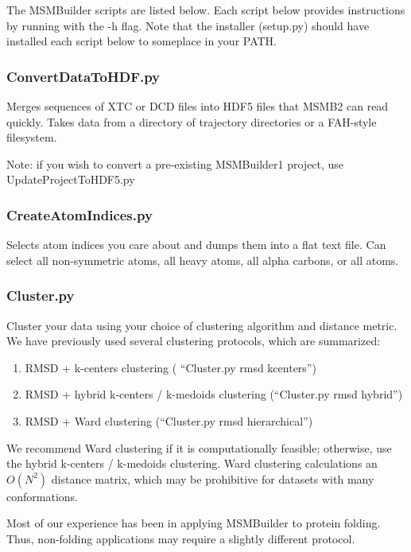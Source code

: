 \documentclass[12pt]{article}
\begin{document}
The MSMBuilder scripts are listed below.  Each script below provides instructions by running with the -h flag.  Note that the installer (setup.py) should have installed each script below to someplace in your PATH.  

\subsubsection{ConvertDataToHDF.py}

Merges sequences of XTC or DCD files into HDF5 files that MSMB2 can read quickly.  Takes data from a directory of trajectory directories or a FAH-style filesystem.  

Note: if you wish to convert a pre-existing MSMBuilder1 project, use UpdateProjectToHDF5.py 

\subsubsection{CreateAtomIndices.py}
Selects atom indices you care about and dumps them into a flat text file. Can select all non-symmetric atoms, all heavy atoms, all alpha carbons, or all atoms.

\subsubsection{Cluster.py}

Cluster your data using your choice of clustering algorithm and distance metric.  We have previously used several clustering protocols, which are summarized:

\begin{enumerate}
 \item RMSD + k-centers clustering \cite{Bowman2009c, Bowman2009a} ( ``Cluster.py  rmsd kcenters'')
 \item RMSD + hybrid k-centers / k-medoids clustering \cite{msmb2} (``Cluster.py  rmsd hybrid'')
 \item RMSD + Ward clustering (``Cluster.py  rmsd hierarchical'')
\end{enumerate}

We recommend Ward clustering if it is computationally feasible; otherwise, use the hybrid k-centers / k-medoids clustering.  Ward clustering calculations an $O(N^2)$ distance matrix, which may be prohibitive for datasets with many conformations.  

Most of our experience has been in applying MSMBuilder to protein folding.  Thus, non-folding applications may require a slightly different protocol.
\end{document}
